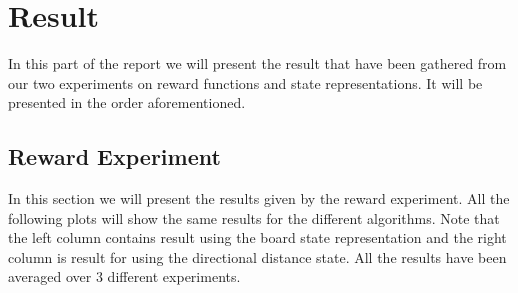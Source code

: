 \documentclass[result.tex]{subfiles}
\begin{document}
    \section*{\centering Result}

    In this part of the report we will present the result that have been gathered from our two experiments on reward functions and state representations. It will be presented in the order aforementioned.

    \subsection*{Reward Experiment}

    In this section we will present the results given by the reward experiment. All the following plots will show the same results for the different algorithms. Note that the left column contains result using the board state representation and the right column is result for using the directional distance state. All the results have been averaged over 3 different experiments.
\end{document}
